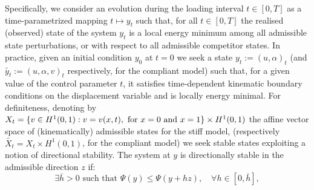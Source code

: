 Specifically, we consider an evolution during the loading interval $t\in [0, T]$ as a time-parametrized mapping $t\mapsto y_t$  such that, for all $t\in [0, T]$ the realised (observed) state of the system $y_t$ is a local energy minimum among all admissible state perturbations, or with respect to all admissible competitor states. %
In practice, given an initial condition $y_0$ at $t=0$ we seek a state $y_t:=(u, \alpha)_t$ (and $\widetilde{y_t}:=(u, \alpha, v)_t$ respectively, for the compliant model) such that, for a given value of the control parameter $t$, it satisfies time-dependent kinematic boundary conditions on the displacement variable and is locally energy minimal.
For definiteness, denoting by $X_t = \{v\in H^1(0, 1):v=v(x, t),\text{ for } x=0\text{ and } x=1\}\times H^1(0,1)$ the affine vector space of (kinematically) admissible states for the stiff model, (respectively $\widetilde{X_t} = X_t\times H^1(0, 1)$, for the compliant model)
we seek {stable states exploiting a notion of directional stability.} {The system at $y$ is directionally stable in the admissible direction $z$ if:}
\begin{equation}
    \exists  \bar{h} > 0  \text{ such that }  \Psi(y) \leq \Psi(y + h z), \quad \forall h \in [0, \bar{h}],
    \label{eq:variational_global_ineq}
\end{equation}
